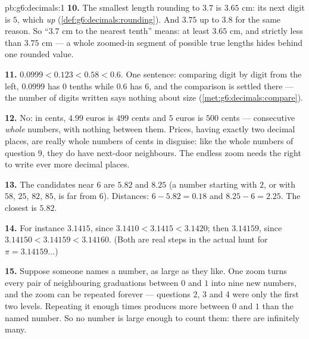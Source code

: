 \begin{solution}{pb:g6:decimals:1}
\textbf{10.} The smallest length rounding to $3.7$ is $3.65$ cm:
its next digit is $5$, which  \emph{up}
(\cref{def:g6:decimals:rounding}). And $3.75$  up to $3.8$
for the same reason. So ``$3.7$ cm to the nearest tenth'' means:
at least $3.65$ cm, and strictly less than $3.75$ cm --- a whole
zoomed-in segment of possible true lengths hides behind one
rounded value.

\textbf{11.} $0.0999 < 0.123 < 0.58 < 0.6$. One sentence:
comparing digit by digit from the left, $0.0999$ has $0$ tenths
while $0.6$ has $6$, and the comparison is settled there --- the
number of digits written says nothing about size
(\cref{met:g6:decimals:compare}).

\textbf{12.} No: in cents, $4.99$ euros is $499$ cents and $5$
euros is $500$ cents --- consecutive \emph{whole} numbers, with
nothing between them. Prices, having exactly two decimal places,
are really whole numbers of cents in disguise: like the whole
numbers of question 9, they do have next-door neighbours. The
endless zoom needs the right to write ever more decimal places.

\textbf{13.} The candidates near $6$ are $5.82$ and $8.25$ (a
number starting with $2$, or with $58$, $25$, $82$, $85$, is far
from $6$). Distances: $6 - 5.82 = 0.18$ and $8.25 - 6 = 2.25$.
The closest is $5.82$.

\textbf{14.} For instance $3.1415$, since
$3.1410 < 3.1415 < 3.1420$; then $3.14159$, since
$3.14150 < 3.14159 < 3.14160$. (Both are real steps in the
actual hunt for $\pi = 3.14159\dots$)

\textbf{15.} Suppose someone names a number, as large as they
like. One zoom turns every pair of neighbouring graduations
between $0$ and $1$ into nine new numbers, and the zoom can be
repeated forever --- questions 2, 3 and 4 were only the first
two levels. Repeating it enough times produces more  between $0$ and $1$ than the named number. So no number
is large enough to count them: there are infinitely many.
\end{solution}
